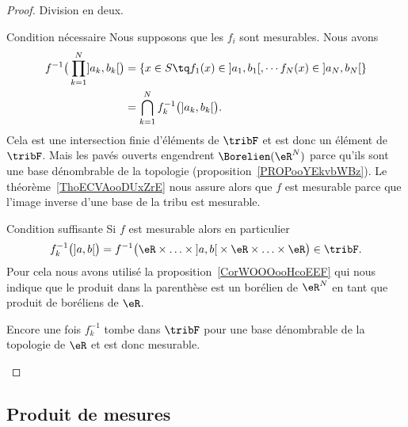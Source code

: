 \begin{proof}
    Division en deux.
    \begin{subproof}
    \item[Condition nécessaire]
        Nous supposons que les \( f_i\) sont mesurables. Nous avons
        \begin{subequations}
            \begin{align}
            f^{-1}\big( \prod_{k=1}^N\mathopen] a_k , b_k \mathclose[ \big)&=\{ x\in S\tq f_1(x)\in\mathopen] a_1 , b_1 \mathclose[ ,\cdots f_N(x)\in\mathopen] a_N , b_N \mathclose[\}\\
            &=\bigcap_{k=1}^Nf_k^{-1}\big( \mathopen] a_k , b_k \mathclose[ \big).
            \end{align}
        \end{subequations}
        Cela est une intersection finie d'éléments de \( \tribF\) et est donc un élément de \( \tribF\). Mais les pavés ouverts engendrent \( \Borelien(\eR^N)\) parce qu'ils sont une base dénombrable de la topologie (proposition~\ref{PROPooYEkvbWBz}). Le théorème~\ref{ThoECVAooDUxZrE} nous assure alors que \( f\) est mesurable parce que l'image inverse d'une base de la tribu est mesurable.
    \item[Condition suffisante]
        Si \( f\) est mesurable alors en particulier
        \begin{equation}
            f_k^{-1}\big( \mathopen] a , b \mathclose[ \big)=f^{-1}\big( \eR\times\ldots\times \mathopen] a , b \mathclose[\times \eR\times\ldots\times \eR \big)\in\tribF.
        \end{equation}
        Pour cela nous avons utilisé la proposition~\ref{CorWOOOooHcoEEF} qui nous indique que le produit dans la parenthèse est un borélien de \( \eR^N\) en tant que produit de boréliens de \( \eR\).

        Encore une fois \( f_k^{-1}\) tombe dans \( \tribF\) pour une base dénombrable de la topologie de \( \eR\) et est donc mesurable.
    \end{subproof}
\end{proof}

\subsection{Produit de mesures}

